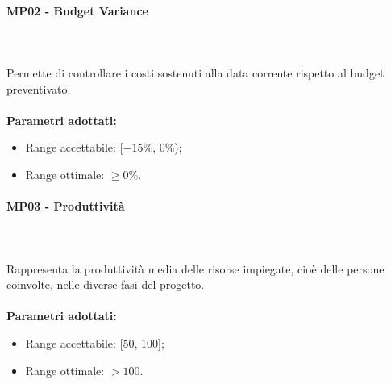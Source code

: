 \paragraph{MP02 - Budget Variance} \mbox{} \\ \mbox{} \\
Permette di controllare i costi sostenuti alla data corrente rispetto al budget preventivato. \\ \\ 
\textbf{Parametri adottati:}  
\begin{itemize}
\item Range accettabile: [$-15\%$, $0\%$); 
\item Range ottimale: $ \geq 0\%$.
\end{itemize}

\paragraph{MP03 - Produttività} \mbox{} \\ \mbox{} \\
Rappresenta la produttività media delle risorse impiegate, cioè delle persone coinvolte, nelle diverse fasi del progetto. \\ \\ 
\textbf{Parametri adottati:} 
\begin{itemize}
	\item Range accettabile: [50, 100];
	\item Range ottimale: $ > 100$.
\end{itemize}


